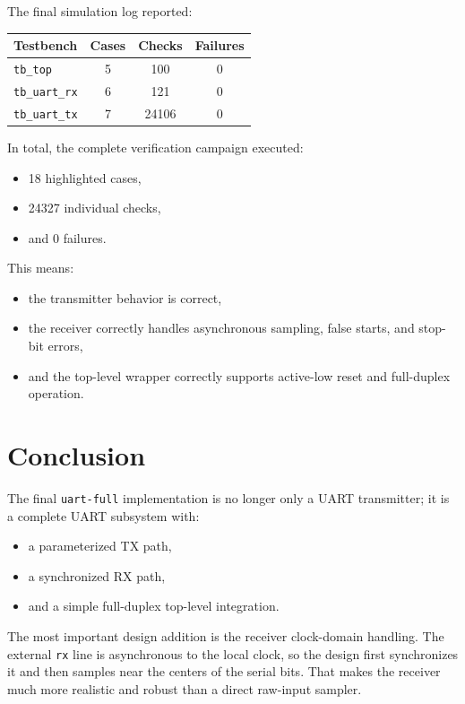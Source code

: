 \documentclass[12pt]{article}
\begin{document}
The final simulation log reported:

\begin{center}
\begin{tabular}{@{}lccc@{}}
\toprule
\textbf{Testbench} & \textbf{Cases} & \textbf{Checks} & \textbf{Failures} \\
\midrule
\texttt{tb\_top}     & 5 & 100   & 0 \\
\texttt{tb\_uart\_rx} & 6 & 121   & 0 \\
\texttt{tb\_uart\_tx} & 7 & 24106 & 0 \\
\bottomrule
\end{tabular}
\end{center}

In total, the complete verification campaign executed:

\begin{itemize}
    \item 18 highlighted cases,
    \item 24327 individual checks,
    \item and 0 failures.
\end{itemize}

This means:

\begin{itemize}
    \item the transmitter behavior is correct,
    \item the receiver correctly handles asynchronous sampling, false starts, and
    stop-bit errors,
    \item and the top-level wrapper correctly supports active-low reset and
    full-duplex operation.
\end{itemize}

\section{Conclusion}

The final \texttt{uart-full} implementation is no longer only a UART transmitter;
it is a complete UART subsystem with:

\begin{itemize}
    \item a parameterized TX path,
    \item a synchronized RX path,
    \item and a simple full-duplex top-level integration.
\end{itemize}

The most important design addition is the receiver clock-domain handling. The
external \texttt{rx} line is asynchronous to the local clock, so the design first
synchronizes it and then samples near the centers of the serial bits. That makes
the receiver much more realistic and robust than a direct raw-input sampler.
\end{document}
